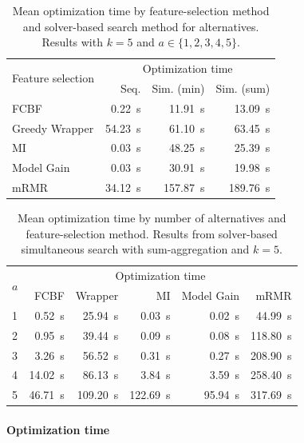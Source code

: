 \documentclass{article}
\theoremstyle{definition}
\begin{document}
\begin{table}[t]
	\centering
	\begin{tabular}{lrrr}
		\toprule
		\multirow{2}{*}{Feature selection} & \multicolumn{3}{c}{Optimization time} \\
		\cmidrule(r){2-4}
		& Seq. & Sim. (min) & Sim. (sum) \\
		\midrule
		FCBF & 0.22~s & 11.91~s & 13.09~s \\
		Greedy Wrapper & 54.23~s & 61.10~s & 63.45~s \\
		MI & 0.03~s & 48.25~s & 25.39~s \\
		Model Gain & 0.03~s & 30.91~s & 19.98~s \\
		mRMR & 34.12~s & 157.87~s & 189.76~s \\
		\bottomrule
	\end{tabular}
	\caption{
		Mean optimization time by feature-selection method and solver-based search method for alternatives.
		Results with $k=5$ and $a \in \{1,2,3,4,5\}$.
	}
	\label{tab:afs:impact-search-fs-method-optimization-time}
\end{table}

\begin{table}[t]
	\centering
	\begin{tabular}{lrrrrr}
		\toprule
		\multirow{2}{*}{$a$} & \multicolumn{5}{c}{Optimization time} \\
		\cmidrule(r){2-6}
		& FCBF & Wrapper & MI & Model Gain & mRMR \\
		\midrule
		1 & 0.52~s & 25.94~s & 0.03~s & 0.02~s & 44.99~s \\
		2 & 0.95~s & 39.44~s & 0.09~s & 0.08~s & 118.80~s \\
		3 & 3.26~s & 56.52~s & 0.31~s & 0.27~s & 208.90~s \\
		4 & 14.02~s & 86.13~s & 3.84~s & 3.59~s & 258.40~s \\
		5 & 46.71~s & 109.20~s & 122.69~s & 95.94~s & 317.69~s \\
		\bottomrule
	\end{tabular}
	\caption{
		Mean optimization time by number of alternatives and feature-selection method.
		Results from solver-based simultaneous search with sum-aggregation and $k=5$.
	}
	\label{tab:afs:impact-num-alternatives-fs-method-optimization-time}
\end{table}

\paragraph{Optimization time}
\end{document}
